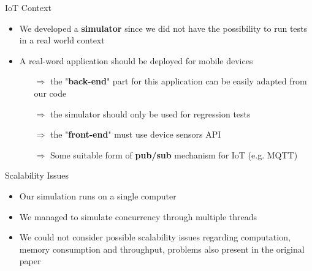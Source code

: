 \begin{block}{IoT Context}
    \begin{itemize} 
        \item We developed a \textbf{simulator} since we did not have the possibility to run tests in a real world context
        \item A real-word application should be deployed for mobile devices
        \begin{itemize}
            \item [$\Rightarrow$] the "\textbf{back-end}" part for this application can be easily adapted from our code
            \item [$\Rightarrow$] the simulator should only be used for regression tests
            \item [$\Rightarrow$] the "\textbf{front-end}" must use device sensors API 
            \item [$\Rightarrow$] Some suitable form of \textbf{pub/sub} mechanism for IoT (e.g. MQTT)
        \end{itemize} 
    \end{itemize}
\end{block}

\vspace{5pt}

\begin{block}{Scalability Issues}
    \begin{itemize}
        \item Our simulation runs on a single computer
        \item We managed to simulate concurrency through multiple threads
        \item We could not consider possible scalability issues regarding computation, memory consumption and throughput, problems also present in the original paper
    \end{itemize} 
\end{block}